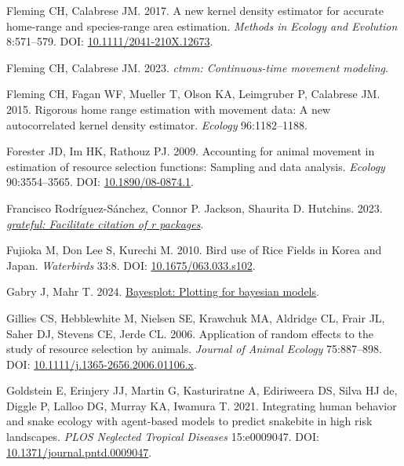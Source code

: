 \documentclass[10pt,a4paper]{article}
\newlength{\cslhangindent}
\newenvironment{CSLReferences}[2] %
 {\begin{list}{}{%
  \setlength{\itemindent}{0pt}
  \setlength{\leftmargin}{0pt}
  \setlength{\parsep}{0pt}
  \ifodd #1
   \setlength{\leftmargin}{\cslhangindent}
   \setlength{\itemindent}{-1\cslhangindent}
  \fi
  \setlength{\itemsep}{#2\baselineskip}}}
 {\end{list}}
\begin{document}
\begin{CSLReferences}{1}{0}
Fleming CH, Calabrese JM. 2017. A new kernel density estimator for accurate home-range and species-range area estimation. \emph{Methods in Ecology and Evolution} 8:571--579. DOI: \href{https://doi.org/10.1111/2041-210X.12673}{10.1111/2041-210X.12673}.

Fleming CH, Calabrese JM. 2023. \emph{{ctmm}: Continuous-time movement modeling}.

Fleming CH, Fagan WF, Mueller T, Olson KA, Leimgruber P, Calabrese JM. 2015. Rigorous home range estimation with movement data: {A} new autocorrelated kernel density estimator. \emph{Ecology} 96:1182--1188.

Forester JD, Im HK, Rathouz PJ. 2009. Accounting for animal movement in estimation of resource selection functions: Sampling and data analysis. \emph{Ecology} 90:3554--3565. DOI: \href{https://doi.org/10.1890/08-0874.1}{10.1890/08-0874.1}.

Francisco Rodríguez-Sánchez, Connor P. Jackson, Shaurita D. Hutchins. 2023. \emph{\href{https://github.com/Pakillo/grateful}{{grateful}: Facilitate citation of r packages}}.

Fujioka M, Don Lee S, Kurechi M. 2010. Bird use of {Rice} {Fields} in {Korea} and {Japan}. \emph{Waterbirds} 33:8. DOI: \href{https://doi.org/10.1675/063.033.s102}{10.1675/063.033.s102}.

Gabry J, Mahr T. 2024. \href{https://mc-stan.org/bayesplot/}{Bayesplot: Plotting for bayesian models}.

Gillies CS, Hebblewhite M, Nielsen SE, Krawchuk MA, Aldridge CL, Frair JL, Saher DJ, Stevens CE, Jerde CL. 2006. Application of random effects to the study of resource selection by animals. \emph{Journal of Animal Ecology} 75:887--898. DOI: \href{https://doi.org/10.1111/j.1365-2656.2006.01106.x}{10.1111/j.1365-2656.2006.01106.x}.

Goldstein E, Erinjery JJ, Martin G, Kasturiratne A, Ediriweera DS, Silva HJ de, Diggle P, Lalloo DG, Murray KA, Iwamura T. 2021. Integrating human behavior and snake ecology with agent-based models to predict snakebite in high risk landscapes. \emph{PLOS Neglected Tropical Diseases} 15:e0009047. DOI: \href{https://doi.org/10.1371/journal.pntd.0009047}{10.1371/journal.pntd.0009047}.


\end{CSLReferences}
\end{document}
